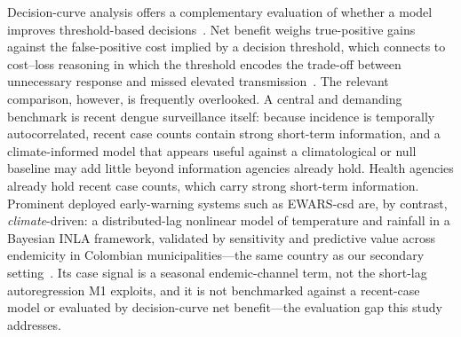 \documentclass[11pt,a4paper]{article}
\begin{document}
Decision-curve analysis offers a complementary evaluation of whether a model improves threshold-based decisions~\cite{Vickers2006,Vickers2016,Vickers2019}. Net benefit weighs true-positive gains against the false-positive cost implied by a decision threshold, which connects to cost--loss reasoning in which the threshold encodes the trade-off between unnecessary response and missed elevated transmission~\cite{Murphy1985,Tozan2023}. The relevant comparison, however, is frequently overlooked. A central and demanding benchmark is recent dengue surveillance itself: because incidence is temporally autocorrelated, recent case counts contain strong short-term information, and a climate-informed model that appears useful against a climatological or null baseline may add little beyond information agencies already hold. Health agencies already hold recent case counts, which carry strong short-term information. Prominent deployed early-warning systems such as EWARS-csd are, by contrast, \emph{climate}-driven: a distributed-lag nonlinear model of temperature and rainfall in a Bayesian INLA framework, validated by sensitivity and predictive value across endemicity in Colombian municipalities---the same country as our secondary setting~\cite{EWARScsd}. Its case signal is a seasonal endemic-channel term, not the short-lag autoregression M1 exploits, and it is not benchmarked against a recent-case model or evaluated by decision-curve net benefit---the evaluation gap this study addresses.
\end{document}
